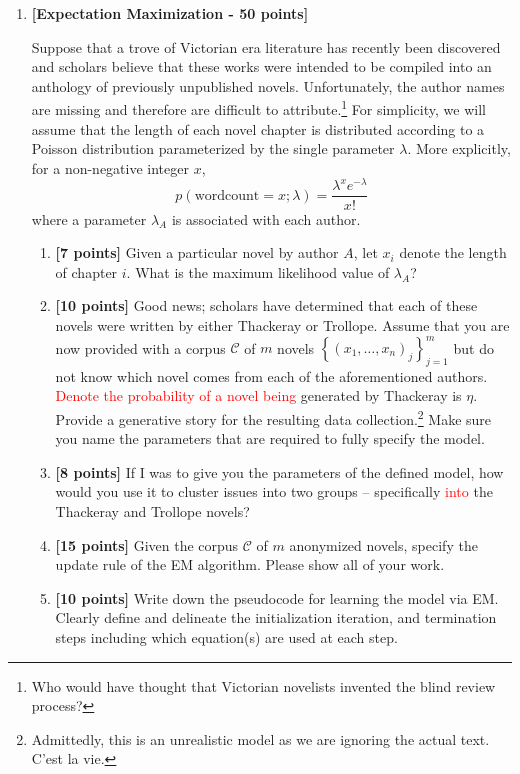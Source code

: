 \documentclass[12pt,letterpaper]{article}
\newcommand{\red}[1]{\textcolor{red}{#1}}
\begin{document}
\begin{enumerate}
\item
{\bf [Expectation Maximization - 50 points]}

Suppose that a trove of Victorian era literature has recently been discovered and scholars believe that these works were intended to be compiled into an anthology of previously unpublished novels.  Unfortunately, the author names are missing and therefore are difficult to attribute.\footnote{Who would have thought that Victorian novelists invented the blind review process?}  For simplicity, we will assume that the length of each novel chapter is distributed according to a Poisson distribution parameterized by the single parameter $\lambda$.  More explicitly, for a non-negative integer $x$,
%
$$p(\mbox{wordcount}=x ; \lambda) = \frac{\lambda^x e^{-\lambda}}{x!}$$
%
where a parameter $\lambda_A$ is associated with each author.

\begin{enumerate}
\item
{\bf [7 points]}  Given a particular novel by author $A$, let $x_i$ denote the length of chapter $i$.  What is the maximum likelihood value of $\lambda_A$?
%
\item
{\bf [10 points]}  Good news; scholars have determined that each of these novels were written by either Thackeray or Trollope.  Assume that you are now provided with a corpus $\mathcal{C}$ of $m$ novels $\left\{ (x_1, \ldots, x_n)_j \right\}_{j=1}^m$ but do not know which novel comes from each of the aforementioned authors.  \red{Denote the probability of a novel being} generated by Thackeray is $\eta$.  Provide a generative story for the resulting data collection.\footnote{Admittedly, this is an unrealistic model as we are ignoring the actual text. C'est la vie.}  Make sure you name the parameters that are required to fully specify the model.

\item
{\bf [8 points]}  If I was to give you the parameters of the defined model, how would you use it to cluster issues into two groups -- specifically \red{into} the Thackeray and Trollope novels?

\item
{\bf [15 points]}  Given the corpus $\mathcal{C}$ of $m$ anonymized novels, specify the update rule of the EM algorithm.   Please show all of your work.

\item
{\bf [10 points]}  Write down the pseudocode for learning the model via EM.  Clearly define and delineate the initialization iteration, and termination steps including which equation(s) are used at each step.
\end{enumerate}


\end{enumerate}
\end{document}
